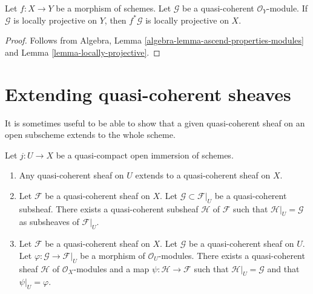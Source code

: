 \begin{lemma}
\label{lemma-locally-projective-pullback}
Let $f : X \to Y$ be a morphism of schemes.
Let $\mathcal{G}$ be a quasi-coherent $\mathcal{O}_Y$-module.
If $\mathcal{G}$ is locally projective on $Y$, then $f^*\mathcal{G}$
is locally projective on $X$.
\end{lemma}

\begin{proof}
Follows from
Algebra, Lemma \ref{algebra-lemma-ascend-properties-modules}
and Lemma \ref{lemma-locally-projective}.
\end{proof}






\section{Extending quasi-coherent sheaves}
\label{section-extending-quasi-coherent-sheaves}

\noindent
It is sometimes useful to be able to show that a given quasi-coherent
sheaf on an open subscheme extends to the whole scheme.

\begin{lemma}
\label{lemma-extend-trivial}
Let $j : U \to X$ be a quasi-compact open immersion of schemes.
\begin{enumerate}
\item Any quasi-coherent sheaf on $U$ extends to a quasi-coherent
sheaf on $X$.
\item Let $\mathcal{F}$ be a quasi-coherent sheaf on $X$.
Let $\mathcal{G} \subset \mathcal{F}|_U$ be a quasi-coherent
subsheaf. There exists a quasi-coherent subsheaf $\mathcal{H}$ of
$\mathcal{F}$ such that $\mathcal{H}|_U = \mathcal{G}$
as subsheaves of $\mathcal{F}|_U$.
\item Let $\mathcal{F}$ be a quasi-coherent sheaf on $X$.
Let $\mathcal{G}$ be a quasi-coherent sheaf on $U$.
Let $\varphi : \mathcal{G} \to \mathcal{F}|_U$ be a morphism
of $\mathcal{O}_U$-modules. There exists a quasi-coherent sheaf $\mathcal{H}$
of $\mathcal{O}_X$-modules and a map $\psi : \mathcal{H} \to \mathcal{F}$
such that $\mathcal{H}|_U = \mathcal{G}$ and that
$\psi|_U = \varphi$.
\end{enumerate}
\end{lemma}

